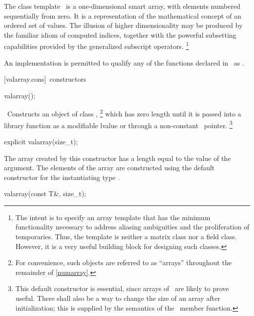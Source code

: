 \documentclass[american,twoside]{book}
\begin{document}
\begin{paras}
\pnum
The
class template
\
is a
one-dimensional smart array, with elements numbered sequentially from zero.
It is a representation of the mathematical concept
of an ordered set of values.
The illusion of higher dimensionality
may be produced by the familiar idiom of computed indices, together
with the powerful subsetting capabilities provided
by the generalized subscript operators.%
\footnote{
The intent is to specify an array template that has the minimum functionality
necessary to address aliasing ambiguities and the proliferation of
temporaries.
Thus, the
template is neither a
matrix class nor a field class.
However, it is a very useful building block for designing such classes.
}

\pnum
An implementation is permitted to qualify any of the functions declared in
\tcode{<valarray>}\
as
.

[valarray.cons]{\ constructors}

%
\begin{itemdecl}
valarray();
\end{itemdecl}

\begin{itemdescr}
\pnum
\effects\ 
Constructs an object of class
,%
\footnote{
For convenience, such objects are referred to as ``arrays'' throughout the
remainder of \ref{numarray}.
}
which has zero length until it is passed into a library function as a
modifiable lvalue or through a non-constant
\
pointer.%
\footnote{
This default constructor is essential,
since arrays of
\
are likely to prove useful.
There shall also be a way to change the size of an array after
initialization; this is supplied by the semantics of the
\tcode{resize}\
member function.
}
\end{itemdescr}

\begin{itemdecl}
explicit valarray(size_t);
\end{itemdecl}

\begin{itemdescr}
\pnum
The array created by this constructor has a length equal to the value of the argument.
The elements of the array are constructed using the default constructor for the
instantiating type .
\end{itemdescr}

\begin{itemdecl}
valarray(const T&, size_t);
\end{itemdecl}


\end{paras}
\end{document}
